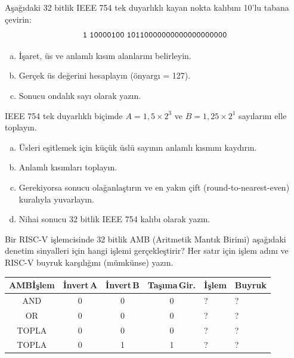 \begin{alistirma}[\orta]
Aşağıdaki 32 bitlik IEEE 754 tek duyarlıklı kayan nokta kalıbını 10'lu tabana çevirin:
\[
\texttt{1\;10000100\;10110000000000000000000}
\]
\begin{enumerate}[(a)]
\item İşaret, üs ve anlamlı kısım alanlarını belirleyin.
\item Gerçek üs değerini hesaplayın (önyargı = 127).
\item Sonucu ondalık sayı olarak yazın.
\end{enumerate}
\end{alistirma}

\begin{alistirma}[\zor]
IEEE 754 tek duyarlıklı biçimde $A = 1{,}5 \times 2^{3}$ ve $B = 1{,}25 \times 2^{1}$ sayılarını elle toplayın.
\begin{enumerate}[(a)]
\item Üsleri eşitlemek için küçük üslü sayının anlamlı kısmını kaydırın.
\item Anlamlı kısımları toplayın.
\item Gerekiyorsa sonucu olağanlaştırın ve en yakın çift (round-to-nearest-even) kuralıyla yuvarlayın.
\item Nihai sonucu 32 bitlik IEEE 754 kalıbı olarak yazın.
\end{enumerate}
\end{alistirma}

\begin{alistirma}[\kolay]
Bir RISC-V işlemcisinde 32 bitlik AMB (Aritmetik Mantık Birimi) aşağıdaki denetim sinyalleri için hangi işlemi gerçekleştirir? Her satır için işlem adını ve RISC-V buyruk karşılığını (mümkünse) yazın.

\begin{table}[htbp]
\centering
\small
\begin{tabular}{c c c c l l}
\toprule
\textbf{AMBİşlem} & \textbf{İnvert\,A} & \textbf{İnvert\,B} & \textbf{Taşıma\,Gir.} & \textbf{İşlem} & \textbf{Buyruk} \\
\midrule
AND  & 0 & 0 & 0 & ? & ? \\
OR   & 0 & 0 & 0 & ? & ? \\
TOPLA & 0 & 0 & 0 & ? & ? \\
TOPLA & 0 & 1 & 1 & ? & ? \\
\bottomrule
\end{tabular}
\end{table}
\end{alistirma}


